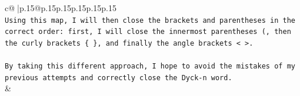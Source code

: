 \documentclass{article}
\begin{document}
{\begin{supertabular}{c@{$\;$}|p{.15\linewidth}@{}p{.15\linewidth}p{.15\linewidth}p{.15\linewidth}p{.15\linewidth}p{.15\linewidth}}
{{{\\ 
\texttt{Using this map, I will then close the brackets and parentheses in the correct order: first, I will close the innermost parentheses (, then the curly brackets \{ \}, and finally the angle brackets < >. } \\
\\ 
\texttt{By taking this different approach, I hope to avoid the mistakes of my previous attempts and correctly close the Dyck{-}n word.} \\
            }
        }
    }
    & \\ \\

\end{supertabular}
}
\end{document}
